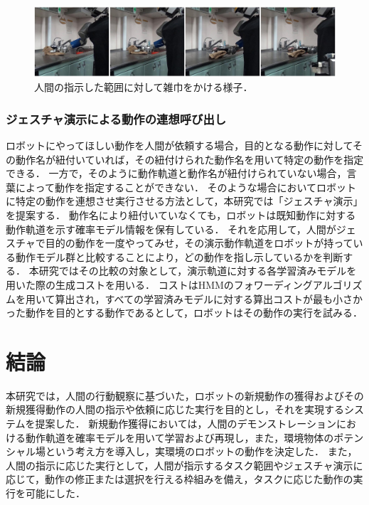 \documentclass[twocolumn]{preport}
\begin{document}
\begin{figure}[htbp]
 \begin{center}
  \includegraphics[width=1.0\columnwidth]{figs/wipe.jpg}
  \caption{人間の指示した範囲に対して雑巾をかける様子．}
  \label{figure:wipe}
 \end{center}
\end{figure}

\subsubsection{ジェスチャ演示による動作の連想呼び出し}
ロボットにやってほしい動作を人間が依頼する場合，目的となる動作に対してその動作名が紐付いていれば，その紐付けられた動作名を用いて特定の動作を指定できる．
一方で，そのように動作軌道と動作名が紐付けられていない場合，言葉によって動作を指定することができない．
そのような場合においてロボットに特定の動作を連想させ実行させる方法として，本研究では「ジェスチャ演示」を提案する．
動作名により紐付いていなくても，ロボットは既知動作に対する動作軌道を示す確率モデル情報を保有している．
それを応用して，人間がジェスチャで目的の動作を一度やってみせ，その演示動作軌道をロボットが持っている動作モデル群と比較することにより，どの動作を指し示しているかを判断する．
本研究ではその比較の対象として，演示軌道に対する各学習済みモデルを用いた際の生成コストを用いる．
コストはHMMのフォワーディングアルゴリズムを用いて算出され，すべての学習済みモデルに対する算出コストが最も小さかった動作を目的とする動作であるとして，ロボットはその動作の実行を試みる．

\section{結論}
本研究では，人間の行動観察に基づいた，ロボットの新規動作の獲得およびその新規獲得動作の人間の指示や依頼に応じた実行を目的とし，それを実現するシステムを提案した．
新規動作獲得においては，人間のデモンストレーションにおける動作軌道を確率モデルを用いて学習および再現し，また，環境物体のポテンシャル場という考え方を導入し，実環境のロボットの動作を決定した．
また，人間の指示に応じた実行として，人間が指示するタスク範囲やジェスチャ演示に応じて，動作の修正または選択を行える枠組みを備え，タスクに応じた動作の実行を可能にした．



\end{document}
